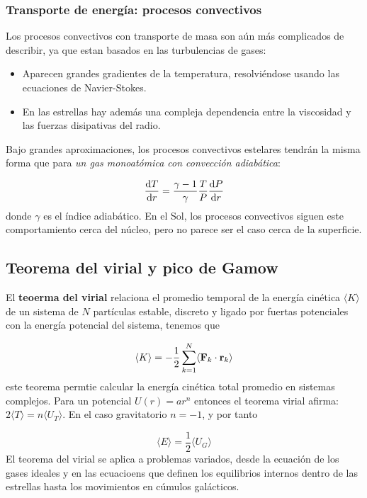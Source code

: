 \subsubsection{Transporte de energía: procesos convectivos}

Los procesos convectivos con transporte de masa son aún más complicados de describir, ya que estan basados en las turbulencias de gases:

\begin{itemize}
    \item Aparecen grandes gradientes de la temperatura, resolviéndose usando las ecuaciones de Navier-Stokes.
    \item En las estrellas hay además una compleja dependencia entre la viscosidad y las fuerzas disipativas del radio. 
\end{itemize}
Bajo grandes aproximaciones, los procesos convectivos estelares tendrán la misma forma que para \textit{un gas monoatómica con convección adiabática}:

\begin{equation}
    \frac{\mathrm{d} T}{\mathrm{d} r} = \frac{\gamma-1}{\gamma} \frac{T}{P} \frac{\mathrm{d} P}{\mathrm{d} r}
\end{equation}
donde $\gamma$ es el índice adiabático. En el Sol, los procesos convectivos siguen este comportamiento cerca del núcleo, pero no parece ser el caso cerca de la superficie. 

\subsection{Teorema del virial y pico de Gamow}

El \textbf{teoerma del virial} relaciona el promedio temporal de la energía cinética $\langle K \rangle$ de un sistema de $N$ partículas estable, discreto y ligado por fuertas potenciales con la energía potencial del sistema, tenemos que

\begin{equation}
    \langle K \rangle = - \frac{1}{2} \sum_{k=1}^N \langle \mathbf{F}_k  \cdot \mathbf{r}_k\rangle
\end{equation}
este teorema permtie calcular la energía cinética total promedio en sistemas complejos. Para un potencial $U(r)=ar^n$ entonces el teorema virial afirma: $2\langle T \rangle = n\langle U_T\rangle$. En el caso gravitatorio $n=-1$, y por tanto 

\begin{equation}
    \langle E \rangle = \frac{1}{2} \langle U_G \rangle
\end{equation}
El teorema del virial se aplica a problemas variados, desde la ecuación de los gases ideales y en las ecuacioens que definen los equilibrios internos dentro de las estrellas hasta los movimientos en cúmulos galácticos. 

